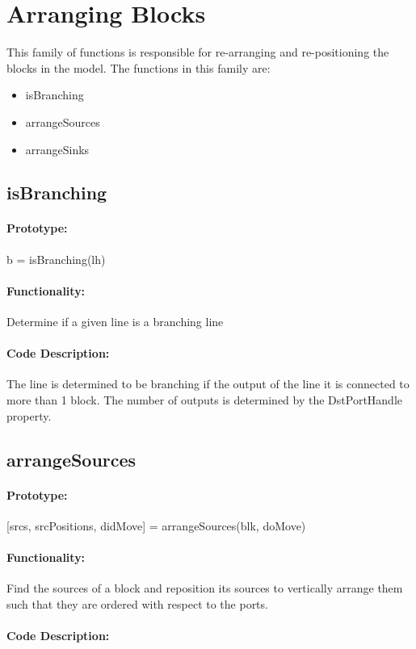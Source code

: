 \documentclass[12pt,letterpaper]{report}
\begin{document}
\section{Arranging  Blocks}
\par This family of functions is responsible for re-arranging and re-positioning the blocks in the model. The functions in this family are:
\begin{itemize}
	\item isBranching
	\item arrangeSources
	\item arrangeSinks
\end{itemize}

\subsection{isBranching}
\paragraph{Prototype:} b = isBranching(lh)
\paragraph{Functionality:} Determine if a given line is a branching line
\paragraph{Code Description:} The line is determined to be branching if the output of the line it is connected to more than 1 block. The number of outputs is determined by the DstPortHandle property.

\subsection{arrangeSources}
\paragraph{Prototype:} [srcs, srcPositions, didMove] = arrangeSources(blk, doMove)
\paragraph{Functionality:} Find the sources of a block and reposition its sources to vertically arrange them such that they are ordered with respect to the ports.
\paragraph{Code Description:} %
\end{document}
